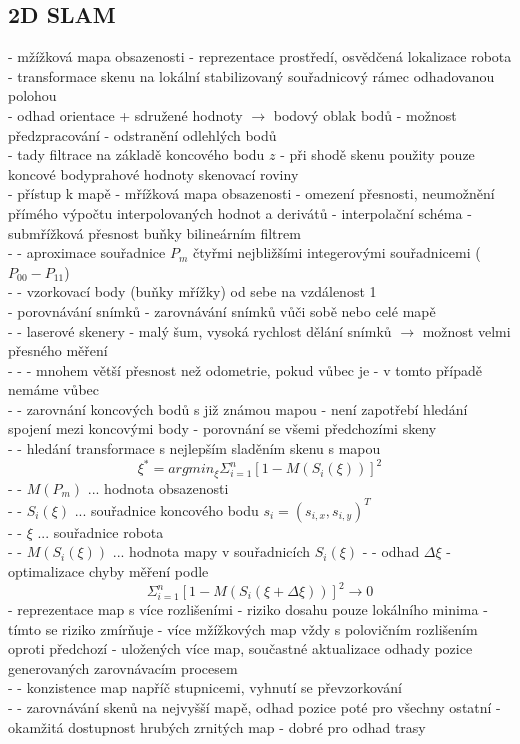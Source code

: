 \documentclass[11pt]{article}
\begin{document}
\subsection{2D SLAM}
- mžížková mapa obsazenosti - reprezentace prostředí, osvědčená lokalizace robota\\
- transformace skenu na lokální stabilizovaný souřadnicový rámec odhadovanou polohou\\
- odhad orientace + sdružené hodnoty $\rightarrow$ bodový oblak bodů - možnost předzpracování - odstranění odlehlých bodů\\
- tady filtrace na základě koncového bodu $z$ - při shodě skenu použity pouze koncové bodyprahové hodnoty skenovací roviny\\
- přístup k mapě - mřížková mapa obsazenosti - omezení přesnosti, neumožnění přímého výpočtu interpolovaných hodnot a derivátů - interpolační schéma - submřížková přesnost buňky bilineárním filtrem\\
- - aproximace souřadnice $P_m$ čtyřmi nejbližšími integerovými souřadnicemi ($P_{00} - P_{11}$)\\
- - vzorkovací body (buňky mřížky) od sebe na vzdálenost 1\\
- porovnávání snímků - zarovnávání snímků vůči sobě nebo celé mapě\\
- - laserové skenery - malý šum, vysoká rychlost dělání snímků $\rightarrow$ možnost velmi přesného měření\\
- - - mnohem větší přesnost než odometrie, pokud vůbec je - v tomto případě nemáme vůbec\\
- - zarovnání koncových bodů s již známou mapou - není zapotřebí hledání spojení mezi koncovými body - porovnání se všemi předchozími skeny\\
- - hledání transformace s nejlepším sladěním skenu s mapou
$$\xi^*=argmin_\xi\Sigma_{i=1}^n[1-M(S_i(\xi))]^2$$
- - $M(P_m)$ ... hodnota obsazenosti\\
- - $S_i(\xi)$ ... souřadnice koncového bodu $s_i=(s_{i,x},s_{i,y})^T$\\
- - $\xi$ ... souřadnice robota\\
- - $M(S_i(\xi))$ ... hodnota mapy v souřadnicích $S_i(\xi)$
- - odhad $\Delta\xi$ - optimalizace chyby měření podle
$$\Sigma_{i=1}^n[1-M(S_i(\xi+\Delta\xi))]^2\rightarrow 0$$
- reprezentace map s více rozlišeními - riziko dosahu pouze lokálního minima - tímto se riziko zmírňuje - více mžížkových map vždy s polovičním rozlišením oproti předchozí - uložených více map, součastné aktualizace odhady pozice generovaných zarovnávacím procesem\\
- - konzistence map napříč stupnicemi, vyhnutí se převzorkování\\
- - zarovnávání skenů na nejvyšší mapě, odhad pozice poté pro všechny ostatní - okamžitá dostupnost hrubých zrnitých map - dobré pro odhad trasy\\
 
\end{document}
